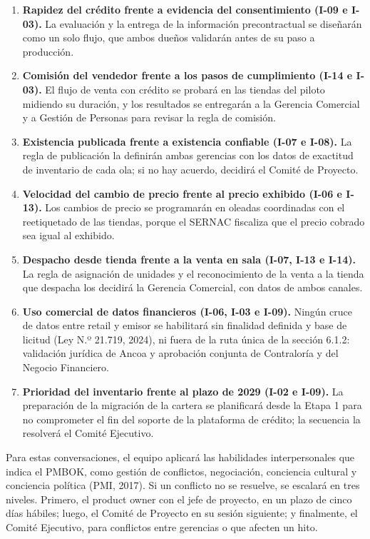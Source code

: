 \documentclass[11pt]{article}
\begin{document}
\begin{enumerate}
\def\labelenumi{\arabic{enumi}.}
\item
  \textbf{Rapidez del crédito frente a evidencia del consentimiento
  (I-09 e I-03).} La evaluación y la entrega de la información
  precontractual se diseñarán como un solo flujo, que ambos dueños
  validarán antes de su paso a producción.
\item
  \textbf{Comisión del vendedor frente a los pasos de cumplimiento (I-14
  e I-03).} El flujo de venta con crédito se probará en las tiendas del
  piloto midiendo su duración, y los resultados se entregarán a la
  Gerencia Comercial y a Gestión de Personas para revisar la regla de
  comisión.
\item
  \textbf{Existencia publicada frente a existencia confiable (I-07 e
  I-08).} La regla de publicación la definirán ambas gerencias con los
  datos de exactitud de inventario de cada ola; si no hay acuerdo,
  decidirá el Comité de Proyecto.
\item
  \textbf{Velocidad del cambio de precio frente al precio exhibido (I-06
  e I-13).} Los cambios de precio se programarán en oleadas coordinadas
  con el reetiquetado de las tiendas, porque el SERNAC fiscaliza que el
  precio cobrado sea igual al exhibido.
\item
  \textbf{Despacho desde tienda frente a la venta en sala (I-07, I-13 e
  I-14).} La regla de asignación de unidades y el reconocimiento de la
  venta a la tienda que despacha los decidirá la Gerencia Comercial, con
  datos de ambos canales.
\item
  \textbf{Uso comercial de datos financieros (I-06, I-03 e I-09).}
  Ningún cruce de datos entre retail y emisor se habilitará sin finalidad definida y base de licitud (Ley N.º 21.719, 2024), ni fuera de la ruta única de la sección 6.1.2: validación jurídica de Ancoa y aprobación conjunta de Contraloría y del Negocio Financiero.
\item
  \textbf{Prioridad del inventario frente al plazo de 2029 (I-02 e
  I-09).} La preparación de la migración de la cartera se planificará
  desde la Etapa 1 para no comprometer el fin del soporte de la
  plataforma de crédito; la secuencia la resolverá el Comité Ejecutivo.
\end{enumerate}

Para estas conversaciones, el equipo aplicará las habilidades
interpersonales que indica el PMBOK, como gestión de conflictos,
negociación, conciencia cultural y conciencia política (PMI, 2017). Si
un conflicto no se resuelve, se escalará en tres niveles. Primero, el
product owner con el jefe de proyecto, en un plazo de cinco días
hábiles; luego, el Comité de Proyecto en su sesión siguiente; y
finalmente, el Comité Ejecutivo, para conflictos entre gerencias o que
afecten un hito.
\end{document}
